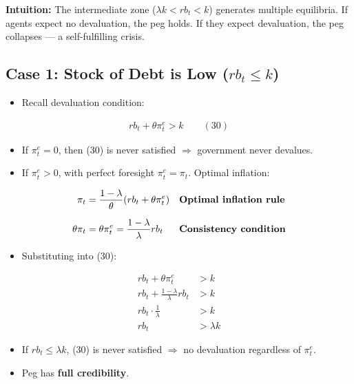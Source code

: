\documentclass[12pt]{article}
\begin{document}
\textbf{Intuition:} The intermediate zone ($\lambda k < rb_t < k$) generates multiple equilibria. If agents expect no devaluation, the peg holds. If they expect devaluation, the peg collapses --- a self-fulfilling crisis.

\subsection*{Case 1: Stock of Debt is Low ($rb_t \leq k$)}

\begin{itemize}
    \item Recall devaluation condition:
\end{itemize}

\singlespacing
\begin{align}
rb_t + \theta \pi_t^e > k \quad\quad (30)
\end{align}

\begin{itemize}
    \item If $\pi_t^e = 0$, then (30) is never satisfied $\Rightarrow$ government never devalues.
    \item If $\pi_t^e > 0$, with perfect foresight $\pi_t^e = \pi_t$. Optimal inflation:
\end{itemize}

\singlespacing
\begin{align}
\pi_t &= \frac{1-\lambda}{\theta}(rb_t + \theta \pi_t^e) && \text{\textbf{Optimal inflation rule}} \\[6pt]
\theta \pi_t &= \theta \pi_t^e = \frac{1-\lambda}{\lambda} rb_t && \text{\textbf{Consistency condition}}
\end{align}

\begin{itemize}
    \item Substituting into (30):
\end{itemize}

\singlespacing
\begin{align}
rb_t + \theta \pi_t^e &> k \\[6pt]
rb_t + \frac{1-\lambda}{\lambda} rb_t &> k \\[6pt]
rb_t \cdot \frac{1}{\lambda} &> k \\[6pt]
rb_t &> \lambda k
\end{align}

\begin{itemize}
    \item If $rb_t \leq \lambda k$, (30) is never satisfied $\Rightarrow$ no devaluation regardless of $\pi_t^e$.
    \item Peg has \textbf{full credibility}.
\end{itemize}
\end{document}
